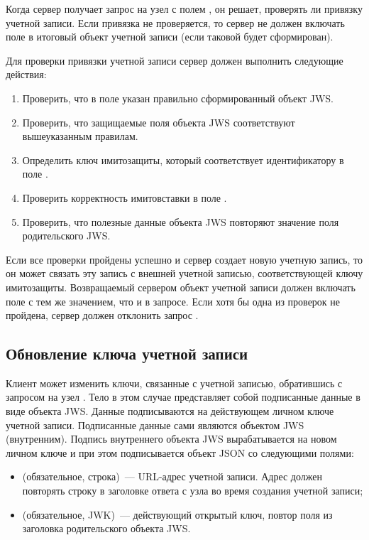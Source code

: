 Когда сервер получает запрос на узел  с полем
, он решает, проверять ли привязку учетной записи.
Если привязка не проверяется, то сервер не должен включать поле
 в итоговый объект учетной записи (если таковой
будет сформирован).

Для проверки привязки учетной записи сервер должен выполнить следующие 
действия:

\begin{enumerate}
\item 
Проверить, что в поле указан правильно сформированный объект JWS.
\item
Проверить, что защищаемые поля объекта JWS соответствуют вышеуказанным 
правилам.  
\item 
Определить ключ имитозащиты, который соответствует идентификатору 
в поле .
\item 
Проверить корректность имитовставки в поле . 
\item 
Проверить, что полезные данные объекта JWS повторяют значение поля
 родительского JWS.
\end{enumerate}

Если все проверки пройдены успешно и сервер создает новую учетную запись, то он 
может связать эту запись с внешней учетной записью, соответствующей ключу 
имитозащиты.
%
Возвращаемый сервером объект учетной записи должен включать поле 
 с тем же значением, что и в запросе. 
%
Если хотя бы одна из проверок не пройдена, сервер должен отклонить запрос
.


\subsection{Обновление ключа учетной записи}\label{ACME.Account.Rollover}

Клиент может изменить ключи, связанные с учетной записью, обратившись с 
запросом на узел . Тело  
в этом случае представляет собой подписанные данные в виде объекта JWS.
%
Данные подписываются на действующем личном ключе учетной записи. Подписанные 
данные сами являются объектом JWS (внутренним). Подпись внутреннего объекта JWS 
вырабатывается на новом личном ключе и при этом подписывается объект JSON
со следующими полями:

\begin{itemize}
\item
{} (обязательное, строка)~--- URL-адрес учетной записи. 
Адрес должен повторять строку в заголовке  ответа с узла 
 во время создания учетной записи;

\item
{} (обязательное, JWK)~--- действующий открытый ключ, повтор
поля  из заголовка родительского объекта JWS. 
\end{itemize}

